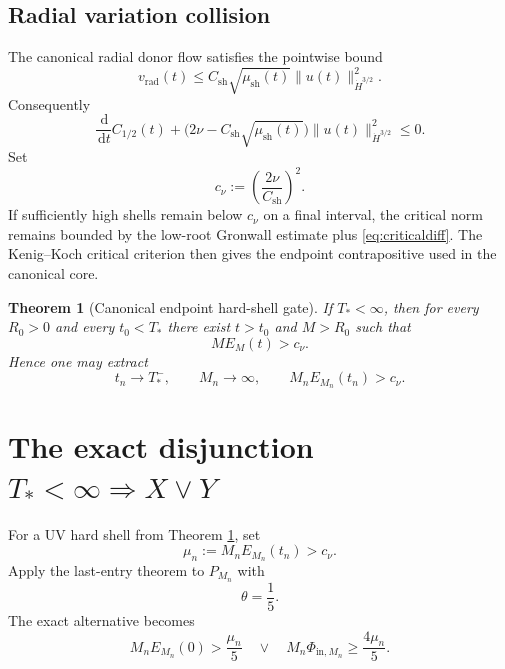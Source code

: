 \documentclass[11pt]{article}
\newtheorem{theorem}{Theorem}[section]
\newcommand{\dd}{\,\mathrm d}
\newcommand{\Hdot}{\dot H}
\begin{document}
\subsection{Radial variation collision}

The canonical radial donor flow satisfies the pointwise bound
\begin{equation}\label{eq:vrad}
\boxed{
v_{\mathrm{rad}}(t)
\le C_{\mathrm{sh}}
\sqrt{\mu_{\mathrm{sh}}(t)}
\|u(t)\|_{\Hdot^{3/2}}^2.
}
\end{equation}
Consequently
\begin{equation}\label{eq:criticaldiff}
\boxed{
\frac{\dd}{\dd t}C_{1/2}(t)
+
\bigl(2\nu-C_{\mathrm{sh}}\sqrt{\mu_{\mathrm{sh}}(t)}\bigr)
\|u(t)\|_{\Hdot^{3/2}}^2
\le0.
}
\end{equation}
Set
\begin{equation}\label{eq:cnu}
\boxed{
c_\nu:=\left(\frac{2\nu}{C_{\mathrm{sh}}}\right)^2.
}
\end{equation}
If sufficiently high shells remain below $c_\nu$ on a final interval, the critical norm remains bounded by the low-root Gronwall estimate plus \eqref{eq:criticaldiff}.  The Kenig--Koch critical criterion then gives the endpoint contrapositive used in the canonical core.

\begin{theorem}[Canonical endpoint hard-shell gate]\label{thm:endpointgate}
If $T_*<\infty$, then for every $R_0>0$ and every $t_0<T_*$ there exist $t>t_0$ and $M>R_0$ such that
\begin{equation}\label{eq:hardgate}
M E_M(t)>c_\nu.
\end{equation}
Hence one may extract
\begin{equation}\label{eq:UVseq}
t_n\to T_*^- ,
\qquad M_n\to\infty,
\qquad
M_nE_{M_n}(t_n)>c_\nu.
\end{equation}
\end{theorem}

\section{The exact disjunction $T_*<\infty\Rightarrow X\vee Y$}

For a UV hard shell from Theorem \ref{thm:endpointgate}, set
\[
\mu_n:=M_nE_{M_n}(t_n)>c_\nu.
\]
Apply the last-entry theorem to $P_{M_n}$ with
\[
\theta=\frac15.
\]
The exact alternative becomes
\begin{equation}\label{eq:XYraw}
\boxed{
M_nE_{M_n}(0)>\frac{\mu_n}{5}
\quad\vee\quad
M_n\Phi_{\mathrm{in},M_n}\ge\frac{4\mu_n}{5}.
}
\end{equation}
\end{document}
